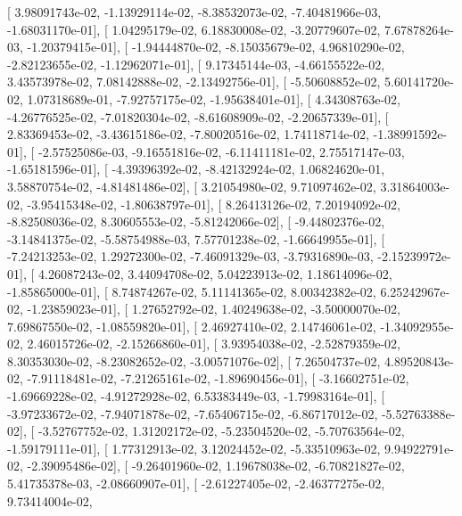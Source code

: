 \documentclass{article}
\begin{document}
       [  3.98091743e-02,  -1.13929114e-02,  -8.38532073e-02,
         -7.40481966e-03,  -1.68031170e-01],
       [  1.04295179e-02,   6.18830008e-02,  -3.20779607e-02,
          7.67878264e-03,  -1.20379415e-01],
       [ -1.94444870e-02,  -8.15035679e-02,   4.96810290e-02,
         -2.82123655e-02,  -1.12962071e-01],
       [  9.17345144e-03,  -4.66155522e-02,   3.43573978e-02,
          7.08142888e-02,  -2.13492756e-01],
       [ -5.50608852e-02,   5.60141720e-02,   1.07318689e-01,
         -7.92757175e-02,  -1.95638401e-01],
       [  4.34308763e-02,  -4.26776525e-02,  -7.01820304e-02,
         -8.61608909e-02,  -2.20657339e-01],
       [  2.83369453e-02,  -3.43615186e-02,  -7.80020516e-02,
          1.74118714e-02,  -1.38991592e-01],
       [ -2.57525086e-03,  -9.16551816e-02,  -6.11411181e-02,
          2.75517147e-03,  -1.65181596e-01],
       [ -4.39396392e-02,  -8.42132924e-02,   1.06824620e-01,
          3.58870754e-02,  -4.81481486e-02],
       [  3.21054980e-02,   9.71097462e-02,   3.31864003e-02,
         -3.95415348e-02,  -1.80638797e-01],
       [  8.26413126e-02,   7.20194092e-02,  -8.82508036e-02,
          8.30605553e-02,  -5.81242066e-02],
       [ -9.44802376e-02,  -3.14841375e-02,  -5.58754988e-03,
          7.57701238e-02,  -1.66649955e-01],
       [ -7.24213253e-02,   1.29272300e-02,  -7.46091329e-03,
         -3.79316890e-03,  -2.15239972e-01],
       [  4.26087243e-02,   3.44094708e-02,   5.04223913e-02,
          1.18614096e-02,  -1.85865000e-01],
       [  8.74874267e-02,   5.11141365e-02,   8.00342382e-02,
          6.25242967e-02,  -1.23859023e-01],
       [  1.27652792e-02,   1.40249638e-02,  -3.50000070e-02,
          7.69867550e-02,  -1.08559820e-01],
       [  2.46927410e-02,   2.14746061e-02,  -1.34092955e-02,
          2.46015726e-02,  -2.15266860e-01],
       [  3.93954038e-02,  -2.52879359e-02,   8.30353030e-02,
         -8.23082652e-02,  -3.00571076e-02],
       [  7.26504737e-02,   4.89520843e-02,  -7.91118481e-02,
         -7.21265161e-02,  -1.89690456e-01],
       [ -3.16602751e-02,  -1.69669228e-02,  -4.91272928e-02,
          6.53383449e-03,  -1.79983164e-01],
       [ -3.97233672e-02,  -7.94071878e-02,  -7.65406715e-02,
         -6.86717012e-02,  -5.52763388e-02],
       [ -3.52767752e-02,   1.31202172e-02,  -5.23504520e-02,
         -5.70763564e-02,  -1.59179111e-01],
       [  1.77312913e-02,   3.12024452e-02,  -5.33510963e-02,
          9.94922791e-02,  -2.39095486e-02],
       [ -9.26401960e-02,   1.19678038e-02,  -6.70821827e-02,
          5.41735378e-03,  -2.08660907e-01],
       [ -2.61227405e-02,  -2.46377275e-02,   9.73414004e-02,
\end{document}
